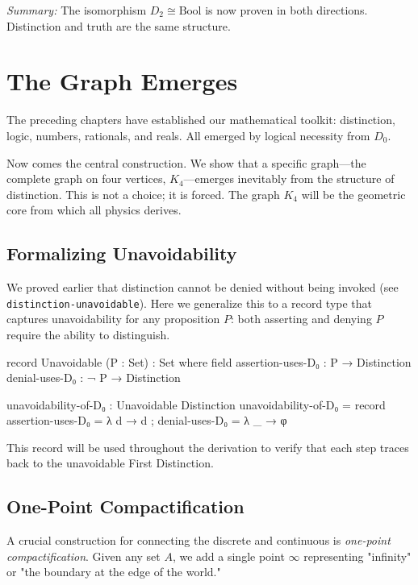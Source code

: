 \documentclass[11pt,a4paper]{book}
\begin{document}
\medskip
\noindent\textit{Summary:} The isomorphism $D_2 \cong \text{Bool}$ is now proven in both 
directions. Distinction and truth are the same structure.

\chapter{The Graph Emerges}
\label{chap:graph-emerges}

The preceding chapters have established our mathematical toolkit: distinction, logic, 
numbers, rationals, and reals. All emerged by logical necessity from $D_0$.

Now comes the central construction. We show that a specific graph—the complete graph on 
four vertices, $K_4$—emerges inevitably from the structure of distinction. This is not a 
choice; it is forced. The graph $K_4$ will be the geometric core from which all physics 
derives.

\section{Formalizing Unavoidability}

We proved earlier that distinction cannot be denied without being invoked 
(see \texttt{distinction-unavoidable}). Here we generalize this to a record 
type that captures unavoidability for any proposition $P$: both asserting 
and denying $P$ require the ability to distinguish.

\begin{code}
record Unavoidable (P : Set) : Set where
  field
    assertion-uses-D₀ : P → Distinction
    denial-uses-D₀    : ¬ P → Distinction

unavoidability-of-D₀ : Unavoidable Distinction
unavoidability-of-D₀ = record
  { assertion-uses-D₀ = λ d → d
  ; denial-uses-D₀    = λ _ → φ
  }
\end{code}

This record will be used throughout the derivation to verify that each step 
traces back to the unavoidable First Distinction.

\section{One-Point Compactification}

A crucial construction for connecting the discrete and continuous is 
\emph{one-point compactification}. Given any set $A$, we add a single 
point $\infty$ representing "infinity" or "the boundary at the edge of 
the world."
\end{document}
